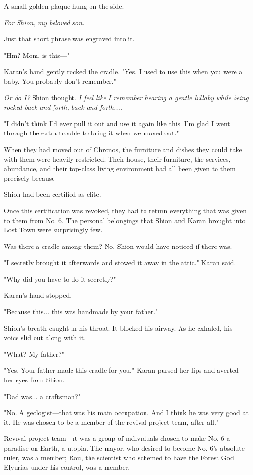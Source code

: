 A small golden plaque hung on the side.

\emph{For Shion, my beloved son.}

Just that short phrase was engraved into it.

"Hm? Mom, is this---"

Karan's hand gently rocked the cradle. "Yes. I used to use this when you
were a baby. You probably don't remember."

\emph{Or do I?} Shion thought. \emph{I feel like I remember hearing a gentle
lullaby while being rocked back and forth, back and forth....}

"I didn't think I'd ever pull it out and use it again like this. I'm
glad I went through the extra trouble to bring it when we moved out."

When they had moved out of Chronos, the furniture and dishes they could
take with them were heavily restricted. Their house, their furniture,
the services, abundance, and their top-class living environment had all
been given to them precisely because~

Shion had been certified as elite.

Once this certification was revoked, they had to return everything that
was given to them from No. 6. The personal belongings that Shion and
Karan brought into Lost Town were surprisingly few.~

Was there a cradle among them? No. Shion would have noticed if there
was.

"I secretly brought it afterwards and stowed it away in the attic,"
Karan said.

"Why did you have to do it secretly?"

Karan's hand stopped.

"Because this... this was handmade by your father."

Shion's breath caught in his throat. It blocked his airway. As he
exhaled, his voice slid out along with it.

"What? My father?"

"Yes. Your father made this cradle for you." Karan pursed her lips and
averted her eyes from Shion.

"Dad was... a craftsman?"

"No. A geologist---that was his main occupation. And I think he was very
good at it. He was chosen to be a member of the revival project team,
after all."

Revival project team---it was a group of individuals chosen to make No. 6
a paradise on Earth, a utopia. The mayor, who desired to become No. 6's
absolute ruler, was a member; Rou, the scientist who schemed to have the
Forest God Elyurias under his control, was a member.

